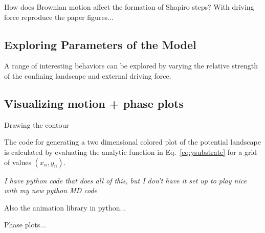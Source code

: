 \documentclass[twocolumn,preprintnumbers,amsmath,amssymb,aps,prx]{revtex4}
\begin{document}
  How does Brownian motion affect
  the formation of Shapiro steps?
  With driving force reproduce the paper figures...

  \subsection{Exploring Parameters of the Model}
  \label{ex:parameters}

  A range of interesting behaviors
  can be explored by varying the
  relative strength of the confining landscape
  and external driving force.  
  


  \subsection{Visualizing motion + phase plots}
  \label{ex:animation}
  
  Drawing the contour 

  The code for generating
  a two dimensional colored plot
  of the potential landscape
  is calculated by evaluating
  the analytic function in Eq.~\ref{eq:ysubstrate}
  for a grid of values $(x_n,y_n)$.

  {\it I have python code that does all of this, but I don't have it
    set up to play nice with my new python MD code}
  
  Also the animation library in python...

  Phase plots...
    
\end{document}
